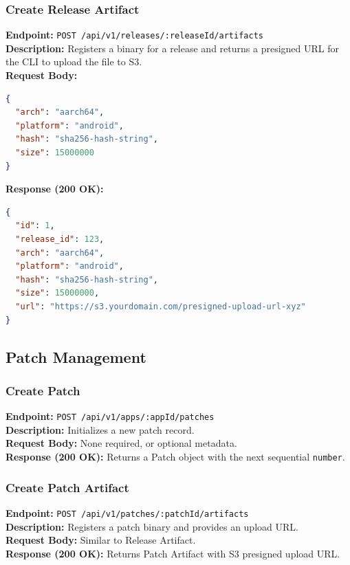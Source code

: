 \documentclass[12pt,a4paper]{article}
\begin{document}
\subsubsection{Create Release Artifact}
\textbf{Endpoint:} \texttt{POST /api/v1/releases/:releaseId/artifacts} \\
\textbf{Description:} Registers a binary for a release and returns a presigned URL for the CLI to upload the file to S3. \\
\textbf{Request Body:}
\begin{lstlisting}[language=json]
{
  "arch": "aarch64",
  "platform": "android",
  "hash": "sha256-hash-string",
  "size": 15000000
}
\end{lstlisting}
\textbf{Response (200 OK):}
\begin{lstlisting}[language=json]
{
  "id": 1,
  "release_id": 123,
  "arch": "aarch64",
  "platform": "android",
  "hash": "sha256-hash-string",
  "size": 15000000,
  "url": "https://s3.yourdomain.com/presigned-upload-url-xyz"
}
\end{lstlisting}

\subsection{Patch Management}

\subsubsection{Create Patch}
\textbf{Endpoint:} \texttt{POST /api/v1/apps/:appId/patches} \\
\textbf{Description:} Initializes a new patch record. \\
\textbf{Request Body:} None required, or optional metadata. \\
\textbf{Response (200 OK):} Returns a Patch object with the next sequential \texttt{number}.

\subsubsection{Create Patch Artifact}
\textbf{Endpoint:} \texttt{POST /api/v1/patches/:patchId/artifacts} \\
\textbf{Description:} Registers a patch binary and provides an upload URL. \\
\textbf{Request Body:} Similar to Release Artifact. \\
\textbf{Response (200 OK):} Returns Patch Artifact with S3 presigned upload URL.
\end{document}

